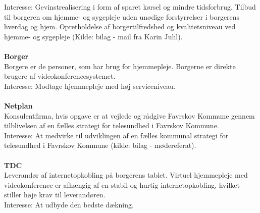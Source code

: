 Interesse: Gevinstrealisering i form af sparet kørsel og mindre tidsforbrug. Tilbud til borgeren om hjemme- og sygepleje uden unødige forstyrrelser i borgerens hverdag og hjem. Opretholdelse af borgertilfredshed og kvalitetsniveau ved hjemme- og sygepleje (Kilde: bilag - mail fra Karin Juhl).\\ \\
\textbf{Borger}\\
Borgere er de personer, som har brug for hjemmepleje. Borgerne er direkte brugere af videokonferencesystemet.\\
Interesse: Modtage hjemmepleje med høj serviceniveau.\\ \\
\textbf{Netplan}\\
Konsulentfirma\cite{netplan}, hvis opgave er at vejlede og rådgive Favrskov Kommune gennem tilblivelsen af en fælles strategi for telesundhed i Favrskov Kommune.\\
Interesse: At medvirke til udviklingen af en fælles kommunal strategi for telesundhed i Favrskov Kommune (kilde: bilag - mødereferat).\\ \\
\textbf{TDC}\\
Leverandør af internetopkobling på borgerens tablet. Virtuel hjemmepleje med videokonference er afhængig af en stabil og hurtig internetopkobling, hvilket stiller høje krav til leverandøren. \\
Interesse: At udbyde den bedste dækning.
